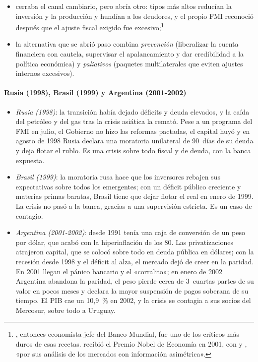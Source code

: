 \documentclass[11pt]{article}
\begin{document}
\begin{itemize}
  \begin{itemize}
  \item cerraba el canal cambiario, pero abría otro: tipos más altos reducían la inversión y la producción y hundían a los deudores, y el propio FMI reconoció después que el ajuste fiscal exigido fue excesivo;\footnote{, entonces economista jefe del Banco Mundial, fue uno de los críticos más duros de esas recetas.  recibió el Premio Nobel de Economía en 2001, con  y , «por sus análisis de los mercados con información asimétrica»\nocite{Nobel2001AkerlofSpenceStiglitz}.}
  \item la alternativa que se abrió paso combina \emph{prevención} (liberalizar la cuenta financiera con cautela, supervisar el apalancamiento y dar credibilidad a la política económica) y \emph{paliativos} (paquetes multilaterales que eviten ajustes internos excesivos).
  \end{itemize}
\end{itemize}

\paragraph{Rusia (1998), Brasil (1999) y Argentina (2001-2002)}

\begin{itemize}
\item \emph{Rusia (1998)}: la transición había dejado déficits y deuda elevados, y la caída del petróleo y del gas tras la crisis asiática la remató. Pese a un programa del FMI en julio, el Gobierno no hizo las reformas pactadas, el capital huyó y en agosto de 1998 Rusia declara una moratoria unilateral de 90~días de su deuda y deja flotar el rublo. Es una crisis sobre todo fiscal y de deuda, con la banca expuesta.
\item \emph{Brasil (1999)}: la moratoria rusa hace que los inversores rebajen sus expectativas sobre todos los emergentes; con un déficit público creciente y materias primas baratas, Brasil tiene que dejar flotar el real en enero de 1999. La crisis no pasó a la banca, gracias a una supervisión estricta. Es un caso de contagio.
\item \emph{Argentina (2001-2002)}: desde 1991 tenía una caja de conversión de un peso por dólar, que acabó con la hiperinflación de los 80. Las privatizaciones atrajeron capital, que se colocó sobre todo en deuda pública en dólares; con la recesión desde 1998 y el déficit al alza, el mercado dejó de creer en la paridad. En 2001 llegan el pánico bancario y el «corralito»; en enero de 2002 Argentina abandona la paridad, el peso pierde cerca de 3~cuartas partes de su valor en pocos meses y declara la mayor suspensión de pagos soberana de su tiempo. El PIB cae un 10,9~\% en 2002, y la crisis se contagia a sus socios del Mercosur, sobre todo a Uruguay.
\end{itemize}
\end{document}
